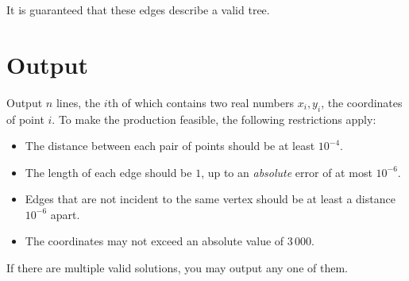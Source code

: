 It is guaranteed that these edges describe a valid tree.

\section*{Output}

Output $n$ lines, the $i$th of which contains two real numbers $x_i,y_i$, the
coordinates of point $i$. To make the production feasible, the
following restrictions apply:
\begin{itemize}
\item The distance between each pair of points should be at least $10^{-4}$.
\item The length of each edge should be $1$, up to an \emph{absolute} error of at
  most $10^{-6}$.
\item Edges that are not incident to the same vertex should be at least a distance $10^{-6}$ apart.
\item The coordinates may not exceed an absolute value of $3\,000$.
\end{itemize}
If there are multiple valid solutions, you may output any one of them.
